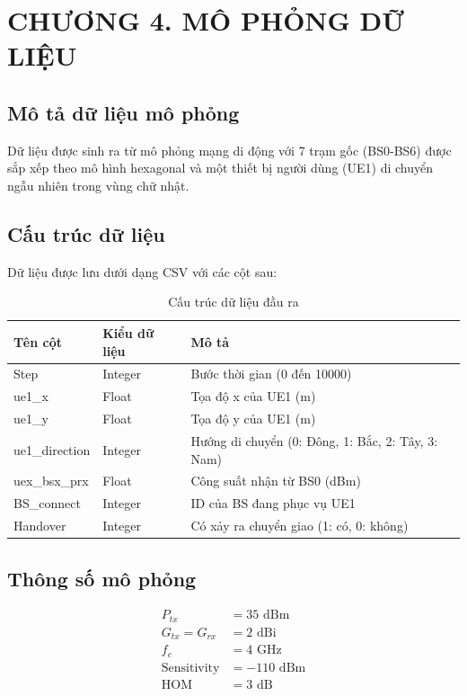 \documentclass{article} %
\begin{document}
\section*{CHƯƠNG 4. MÔ PHỎNG DỮ LIỆU}
\setcounter{section}{4}
\setcounter{subsection}{0}
\setcounter{figure}{0}
\setcounter{table}{0}
\subsection{Mô tả dữ liệu mô phỏng}

Dữ liệu được sinh ra từ mô phỏng mạng di động với 7 trạm gốc (BS0-BS6) được sắp xếp theo mô hình hexagonal và một thiết bị người dùng (UE1) di chuyển ngẫu nhiên trong vùng chữ nhật.

\subsection{Cấu trúc dữ liệu}

Dữ liệu được lưu dưới dạng CSV với các cột sau:

\begin{table}[h]
\centering
\caption{Cấu trúc dữ liệu đầu ra}
\begin{tabular}{|l|l|l|}
\hline
\textbf{Tên cột} & \textbf{Kiểu dữ liệu} & \textbf{Mô tả} \\
\hline
Step & Integer & Bước thời gian (0 đến 10000) \\
\hline
ue1\_x & Float & Tọa độ x của UE1 (m) \\
\hline
ue1\_y & Float & Tọa độ y của UE1 (m) \\
\hline
ue1\_direction & Integer & Hướng di chuyển (0: Đông, 1: Bắc, 2: Tây, 3: Nam) \\
\hline
uex\_bsx\_prx & Float & Công suất nhận từ BS0 (dBm) \\
\hline
BS\_connect & Integer & ID của BS đang phục vụ UE1 \\
\hline
Handover & Integer & Có xảy ra chuyển giao (1: có, 0: không) \\
\hline
\end{tabular}
\label{tab:data_structure}
\end{table}
\subsection{Thông số mô phỏng}

\begin{align}
P_{tx} &= 35 \text{ dBm} \\
G_{tx} = G_{rx} &= 2 \text{ dBi} \\
f_c &= 4 \text{ GHz} \\
\text{Sensitivity} &= -110 \text{ dBm} \\
\text{HOM} &= 3 \text{ dB}
\end{align}
\end{document}

